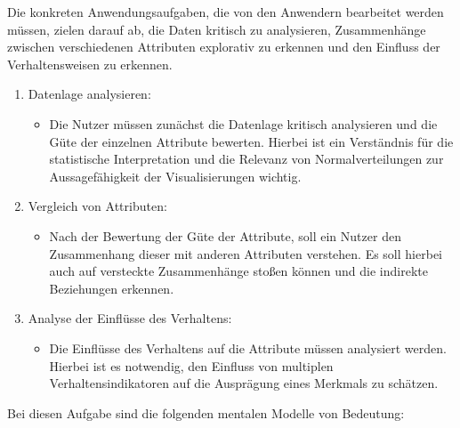 \documentclass[usegeometry=true]{scrartcl}
\begin{document}
Die konkreten Anwendungsaufgaben, die von den Anwendern bearbeitet werden müssen, zielen darauf ab, die Daten kritisch zu analysieren, Zusammenhänge zwischen verschiedenen Attributen explorativ zu erkennen und den Einfluss der Verhaltensweisen zu erkennen.
\begin{enumerate}
  \item Datenlage analysieren:
  \begin{itemize}
    \item    Die Nutzer müssen zunächst die Datenlage kritisch analysieren und die Güte der einzelnen Attribute bewerten. Hierbei ist ein Verständnis für die statistische Interpretation und die Relevanz von Normalverteilungen zur Aussagefähigkeit der Visualisierungen wichtig.

  \end{itemize}
  \item Vergleich von Attributen:
  \begin{itemize}
    \item Nach der Bewertung der Güte der Attribute, soll ein Nutzer den Zusammenhang dieser mit anderen Attributen verstehen. Es soll hierbei auch auf versteckte Zusammenhänge stoßen können und die indirekte Beziehungen erkennen. 
  \end{itemize}
  \item Analyse der Einflüsse des Verhaltens:
  \begin{itemize}
    \item Die Einflüsse des Verhaltens auf die Attribute müssen analysiert werden. Hierbei ist es notwendig, den Einfluss von multiplen Verhaltensindikatoren auf die Ausprägung eines Merkmals zu schätzen.
  \end{itemize}
\end{enumerate}
Bei diesen Aufgabe sind die folgenden mentalen Modelle von Bedeutung:
\end{document}
